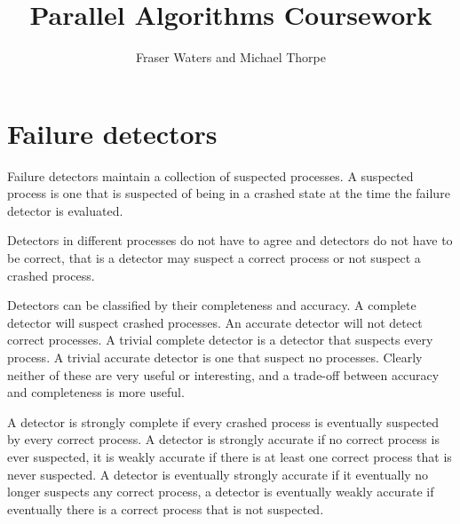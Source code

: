 \documentclass[11pt]{amsart}
\title{Parallel Algorithms Coursework}
\author{Fraser Waters and Michael Thorpe}
\begin{document}
\maketitle

\section{Failure detectors}

Failure detectors maintain a collection of suspected processes. A suspected
process is one that is suspected of being in a crashed state at the time the
failure detector is evaluated.

Detectors in different processes do not have to agree and detectors do not have
to be correct, that is a detector may suspect a correct process or not suspect
a crashed process.

Detectors can be classified by their completeness and accuracy. A complete
detector will suspect crashed processes.  An accurate detector will not detect
correct processes. A trivial complete detector is a detector that suspects
every process. A trivial accurate detector is one that suspect no processes.
Clearly neither of these are very useful or interesting, and a trade-off
between accuracy and completeness is more useful.

A detector is strongly complete if every crashed process is eventually
suspected by every correct process. A detector is strongly accurate if no
correct process is ever suspected, it is weakly accurate if there is at least
one correct process that is never suspected. A detector is eventually strongly
accurate if it eventually no longer suspects any correct process, a detector is
eventually weakly accurate if eventually there is a correct process that is not
suspected. 



\end{document}
